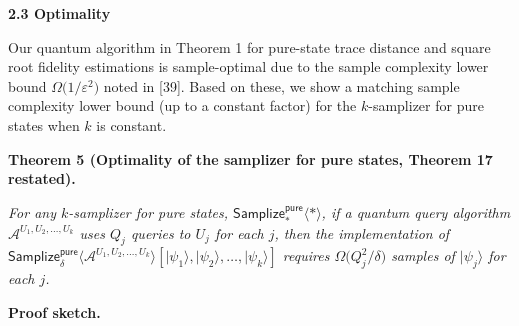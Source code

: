 \documentclass[10pt,a4paper]{article}
\begin{document}




\par\medskip\noindent\textbf{
2.3 Optimality}\par




Our quantum algorithm in
Theorem 1 for pure-state trace distance and square root fidelity estimations is sample-optimal due to the sample complexity lower bound $\Omega\lparen 1/\varepsilon^{2}\rparen$ noted in [39].
Based on these, we show a matching sample complexity lower bound (up to a constant factor) for the $k$-samplizer for pure states when $k$ is constant.\par





\par\medskip\noindent\textbf{
\textbf{Theorem 5}\textbf{ }(Optimality of the samplizer for pure states, Theorem 17 restated)\textbf{.}
}\par



\emph{For any $k$-samplizer for pure states, $\mathsf{Samplize}^{\mathsf{pure}}_{*}\langle*\rangle$,
if a quantum query algorithm $\mathcal{A}^{U_{1},U_{2},\dots,U_{k}}$ uses $Q_{j}$ queries to $U_{j}$ for each $j$,
then the implementation of $\mathsf{Samplize}^{\mathsf{pure}}_{\delta}\langle\mathcal{A}^{U_{1},U_{2},\dots,U_{k}}\rangle[\lvert\psi_{1}\rangle,\lvert\psi_{2}\rangle,\dots,\lvert\psi_{k}\rangle]$ requires $\Omega\lparen Q_{j}^{2}/\delta\rparen$ samples of $\lvert\psi_{j}\rangle$ for each $j$.}\par






\par\medskip\noindent\textbf{Proof sketch.}\par
\end{document}
